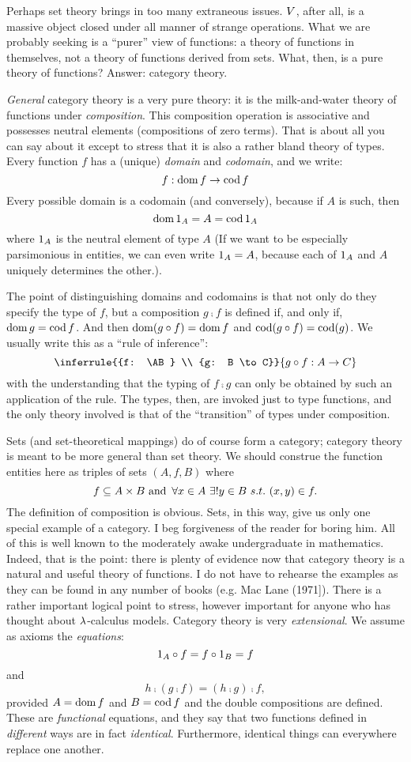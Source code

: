 Perhaps set theory brings in too many extraneous issues. $V$, after all, is a massive object closed under all manner of strange operations. What we are probably seeking is a ``purer'' view of functions: a theory of functions in themselves, not a theory of functions derived from sets. What, then, is a pure theory of functions? Answer: category theory. 

{\it General} category theory is a very pure theory: it is the milk-and-water theory of functions under {\it composition}. This composition operation is associative and possesses neutral ele­ments (compositions of zero terms). That is about all you can say about it except to stress that it is also a rather bland theory of types. Every function $f$ has a (unique) {\it domain} and {\it codomain}, and we write:
$$f: \mathop{\rm dom} f \rightarrow \mathop{\rm cod} f$$
%
Every possible domain is a codomain (and conversely), because if $A$ is such, then
$$\mathop{\rm dom} {\textrm 1}_A = A = \mathop{\rm cod} {\textrm 1}_A$$
%
where ${\textrm 1}_A$ is the neutral element of type $A$ (If we want to be especially parsimonious in entities, we can even write ${\textrm 1}_A = A$, because each of ${\textrm 1}_A$ and $A$ uniquely deter­mines the other.).

The point of distinguishing domains and codomains is that not only do they specify the type of $f$, but a composition $g \comp f$ is
defined if, and only if, $\mathop{\rm dom} g = \mathop{\rm cod} f$. And then $\mathop{\rm dom}(g \circ f) = \mathop{\rm dom} f$ and $\mathop{\rm cod} (g \circ f) = \mathop{\rm cod} (g)$. We usually write this as a ``rule of inference'':
$$
\inferrule
  {{f: \AB} \\ {g: B \to C}}
  {g \comp f: A \to C}
$$
with the understanding that the typing of $f \comp  g$ can only be ob­tained by such an application of the rule. The types, then, are invoked just to type functions, and the only theory involv­ed is that of the ``transition'' of types under composition.

Sets (and set-theoretical mappings) do of course form a cat­egory; category theory is meant to be more general than set theory. We should construe the function entities here as tri­ples of sets $(A,f,B)$ where
$$
f \subseteq A \times B {\textrm{ and }}\, \forall x \in A \,\, \exists! y \in B\,\, s.t. \,\, (x,y) \in f.
$$
%
The definition of composition is obvious. Sets, in this way, give us only one special example of a category.
I beg forgiveness of the reader for boring him. All of this is well known to the moderately awake undergraduate in mathe­matics. Indeed, that is the point: there is plenty of evi­dence now that category theory is a natural and useful theory of functions. I do not have to rehearse the examples as they can be found in any number of books (e.g. Mac Lane (1971]).
There is a rather important logical point to stress, however
important for anyone who has thought about $\lambda$-calculus models. Category theory is very {\it extensional}. We assume as axioms the {\it equations}:
%
$${\textrm 1}_A \circ f = f \circ {\textrm 1}_B =  f$$
%
and
$$h\comp (g \comp f) = (h \comp g) \comp f,$$
%
provided $A= \mathop{\rm dom} f$ and $B = \mathop{\rm cod} f$ and the double compositions are defined. These are {\it functional} equations, and they say that two functions defined in {\it different} ways are in fact {\it identical}.
Furthermore, identical things can everywhere replace one another.

